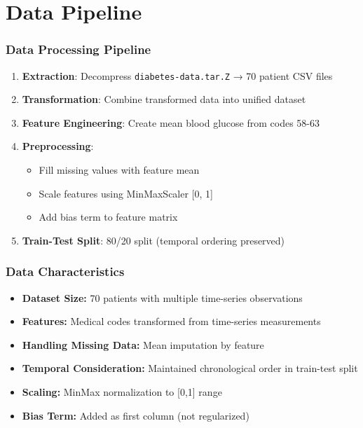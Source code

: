 \documentclass[11pt,aspectratio=169]{beamer}
\begin{document}
\section{Data Pipeline}

\begin{frame}
    \frametitle{Data Processing Pipeline}
    \begin{enumerate}
        \item \textbf{Extraction}: Decompress \texttt{diabetes-data.tar.Z} → 70 patient CSV files
        \item \textbf{Transformation}: Combine transformed data into unified dataset
        \item \textbf{Feature Engineering}: Create mean blood glucose from codes 58-63
        \item \textbf{Preprocessing}:
            \begin{itemize}
                \item Fill missing values with feature mean
                \item Scale features using MinMaxScaler [0, 1]
                \item Add bias term to feature matrix
            \end{itemize}
        \item \textbf{Train-Test Split}: 80/20 split (temporal ordering preserved)
    \end{enumerate}
\end{frame}

\begin{frame}
    \frametitle{Data Characteristics}
    \begin{itemize}
        \item \textbf{Dataset Size:} 70 patients with multiple time-series observations
        \item \textbf{Features:} Medical codes transformed from time-series measurements
        \item \textbf{Handling Missing Data:} Mean imputation by feature
        \item \textbf{Temporal Consideration:} Maintained chronological order in train-test split
        \item \textbf{Scaling:} MinMax normalization to [0,1] range
        \item \textbf{Bias Term:} Added as first column (not regularized)
    \end{itemize}
\end{frame}
\end{document}
